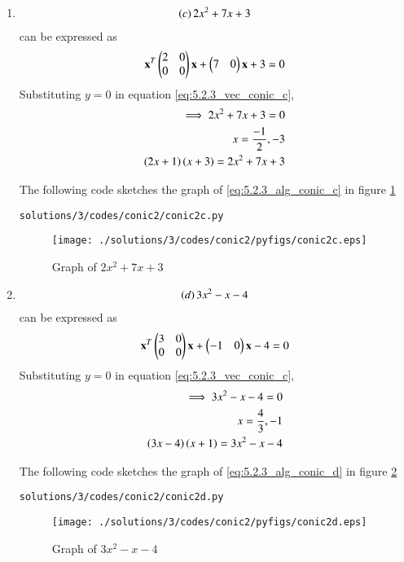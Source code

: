 \begin{enumerate}
\item 
\begin{align}
\label{eq:5.2.3_alg_conic_c}
\left(c\right) 2x^{2} + 7x +3
\end{align}
can be expressed  as 
\begin{align}
\label{eq:5.2.3_vec_conic_c}
\mathbf{x}^T \begin{pmatrix}2 & 0\\0 & 0\end{pmatrix}\mathbf{x}+ \begin{pmatrix}7 & 0\end{pmatrix}\mathbf{x} +3 =0
\end{align}
Substituting $y=0$ in equation \ref{eq:5.2.3_vec_conic_c},
\begin{align}
\implies 
2x^{2}+7x+3=0
\\
x=\frac{-1}{2},-3
\\
\left(2x+1\right)\left(x+3\right)= 2x^{2} + 7x +3
\end{align}

The following code sketches the graph of \ref{eq:5.2.3_alg_conic_c} in figure \ref{fig:5.2.3_conic2c}
\begin{lstlisting}
solutions/3/codes/conic2/conic2c.py
\end{lstlisting}
\begin{figure}[!ht]
\centering
\texttt{[image: ./solutions/3/codes/conic2/pyfigs/conic2c.eps]}
\caption{Graph of $2x^{2} + 7x +3$}
\label{fig:5.2.3_conic2c}
\end{figure}


\item 
\begin{align}
\label{eq:5.2.3_alg_conic_d}
\left(d\right) 3x^{2} -x -4
\end{align}
can be expressed  as 
\begin{align}
\label{eq:5.2.3_vec_conic_d}
\mathbf{x}^T \begin{pmatrix}3 & 0\\0 & 0\end{pmatrix}\mathbf{x}+ \begin{pmatrix}-1 & 0\end{pmatrix}\mathbf{x} -4 =0
\end{align}
Substituting $y=0$ in equation \ref{eq:5.2.3_vec_conic_c},
\begin{align}
\implies 
3x^{2}-x-4=0
\\
x=\frac{4}{3},-1
\\
\left(3x-4\right)\left(x+1\right)= 3x^{2} -x -4
\end{align}

The following code sketches the graph of \ref{eq:5.2.3_alg_conic_d} in figure \ref{fig:5.2.3_conic2d}
\begin{lstlisting}
solutions/3/codes/conic2/conic2d.py
\end{lstlisting}
\begin{figure}[!ht]
\centering
\texttt{[image: ./solutions/3/codes/conic2/pyfigs/conic2d.eps]}
\caption{Graph of $3x^{2} -x -4$}
\label{fig:5.2.3_conic2d}
\end{figure}


\end{enumerate}
